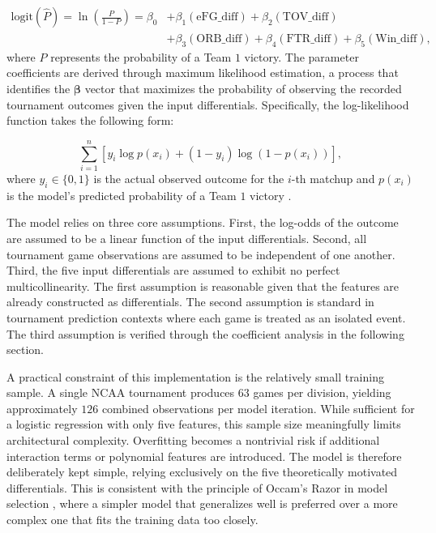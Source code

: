 \documentclass[12pt,leqno]{article}\usepackage[pdftex]{graphicx}\usepackage[dvipsnames]{xcolor}
\theoremstyle{remark}
\begin{document}
\begin{equation}
\begin{split}
\text{logit}(\hat{P}) = \ln\left(\frac{P}{1-P}\right) = \beta_0 & + \beta_1(\text{eFG\_diff}) + \beta_2(\text{TOV\_diff}) \\
& + \beta_3(\text{ORB\_diff}) + \beta_4(\text{FTR\_diff}) + \beta_5(\text{Win\_diff}),
\end{split}
\end{equation}
where $P$ represents the probability of a Team $1$ victory. The parameter coefficients are derived through maximum likelihood estimation, a process that identifies the $\boldsymbol{\beta}$ vector that maximizes the probability of observing the recorded tournament outcomes given the input differentials. Specifically, the log-likelihood function takes the following form:

$$\sum_{i=1}^n \left[ y_i \log p(x_i) + (1-y_i)\log(1-p(x_i)) \right],$$
where $y_i \in \{0, 1\}$ is the actual observed outcome for the $i$-th matchup and $p(x_i)$ is the model's predicted probability of a Team $1$ victory \cite{logistic}.

The model relies on three core assumptions. First, the log-odds of the outcome are assumed to be a linear function of the input differentials. Second, all tournament game observations are assumed to be independent of one another. Third, the five input differentials are assumed to exhibit no perfect multicollinearity. The first assumption is reasonable given that the features are already constructed as differentials. The second assumption is standard in tournament prediction contexts where each game is treated as an isolated event. The third assumption is verified through the coefficient analysis in the following section.

A practical constraint of this implementation is the relatively small training sample. A single NCAA tournament produces $63$ games per division, yielding approximately $126$ combined observations per model iteration. While sufficient for a logistic regression with only five features, this sample size meaningfully limits architectural complexity. Overfitting becomes a nontrivial risk if additional interaction terms or polynomial features are introduced. The model is therefore deliberately kept simple, relying exclusively on the five theoretically motivated differentials. This is consistent with the principle of Occam's Razor in model selection \cite{occam}, where a simpler model that generalizes well is preferred over a more complex one that fits the training data too closely. 
\end{document}
